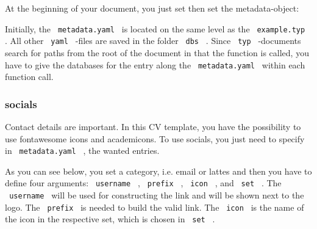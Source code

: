 \begin{Shaded}
\begin{Highlighting}[]
\KeywordTok{:}
\AttributeTok{  }\KeywordTok{:}\AttributeTok{ }
\AttributeTok{  }\KeywordTok{:}\AttributeTok{ }
\AttributeTok{  }\KeywordTok{:}\AttributeTok{ }
\end{Highlighting}
\end{Shaded}

At the beginning of your document, you just set then set the
metadata-object:

\begin{Shaded}
\begin{Highlighting}[]

\end{Highlighting}
\end{Shaded}

Initially, the \texttt{\ metadata.yaml\ } is located on the same level
as the \texttt{\ example.typ\ } . All other \texttt{\ yaml\ } -files are
saved in the folder \texttt{\ dbs\ } . Since \texttt{\ typ\ } -documents
search for paths from the root of the document in that the function is
called, you have to give the databases for the entry along the
\texttt{\ metadata.yaml\ } within each function call.

\subsubsection{socials}\label{socials}

Contact details are important. In this CV template, you have the
possibility to use fontawesome icons and academicons. To use socials,
you just need to specify in \texttt{\ metadata.yaml\ } , the wanted
entries.

As you can see below, you set a category, i.e. email or lattes and then
you have to define four arguments: \texttt{\ username\ } ,
\texttt{\ prefix\ } , \texttt{\ icon\ } , and \texttt{\ set\ } . The
\texttt{\ username\ } will be used for constructing the link and will be
shown next to the logo. The \texttt{\ prefix\ } is needed to build the
valid link. The \texttt{\ icon\ } is the name of the icon in the
respective set, which is chosen in \texttt{\ set\ } .

